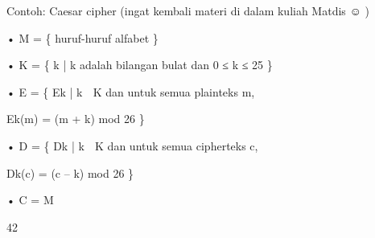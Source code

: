 \documentclass{article}
\begin{document}

Contoh: Caesar cipher   (ingat kembali materi di dalam kuliah Matdis ☺ )

• M = \{ huruf-huruf alfabet \}

• K = \{ k | k  adalah bilangan bulat dan 0 ≤ k ≤ 25 \}

• E = \{ Ek | k  K dan untuk semua plainteks m,




Ek(m) = (m + k) mod 26 \}

• D = \{ Dk | k  K dan untuk semua cipherteks c,




Dk(c) = (c – k) mod 26 \}

• C = M

42
\end{document}
